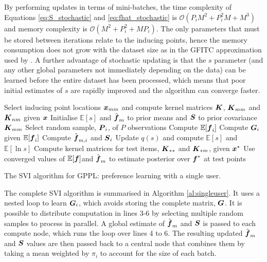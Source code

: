 By performing updates in terms of mini-batches, 
the time complexity of Equations \ref{eq:S_stochastic} and
\ref{eq:fhat_stochastic} is
$\mathcal{O}(P_i M^2 + P_i^2 M + M^3)$ and
memory complexity is  $\mathcal{O}(M^2 + P_i^2 + M P_i)$.
The only parameters that must be stored between iterations relate to the 
inducing points, hence the memory consumption does not grow with the dataset size 
as in the GFITC approximation used by \citet{houlsby2012collaborative}.
A further advantage of stochastic updating is that the $s$ parameter (and any other global
parameters not immediately depending on the data) can be learned
before the entire dataset has been processed,
which means that poor initial estimates of $s$ are rapidly improved
and the algorithm can converge faster.

\begin{algorithm}[t]
 \nl Select inducing point locations $\boldsymbol x_{mm}$ and compute kernel matrices $\boldsymbol K$, $\boldsymbol K_{mm}$ and $\boldsymbol K_{nm}$ given $\boldsymbol x$ \;
 \nl Initialise $\mathbb{E}[s]$ and $\hat{\boldsymbol f}_m$ to prior means
 and $\boldsymbol S$ to prior covariance $\boldsymbol K_{mm}$\;
 {
 \nl Select random sample, $\boldsymbol P_i$, of $P$ observations\;
  {
  \nl Compute $\mathbb{E}[\boldsymbol f_i]$ \;
  \nl Compute $\boldsymbol G_i$ given $\mathbb{E}[\boldsymbol f_i]$ \;
  \nl Compute $\hat{\boldsymbol f}_{m,i}$ and $\boldsymbol S_{i}$ \;
  }
 \nl Update $q(s)$ and compute $\mathbb{E}[s]$ and $\mathbb{E}[\ln s]$\;
 }
\nl Compute kernel matrices for test items, $\boldsymbol K_{**}$ and $\boldsymbol K_{*m}$, given $\boldsymbol x^*$ \;
\nl Use converged values of $\mathbb{E}[\boldsymbol f]$and $\hat{\boldsymbol f}_m$ to estimate
posterior over $\boldsymbol f^*$ at test points \;
\vspace{0.2cm}
\caption{The SVI algorithm for GPPL: preference learning with a single user.}
\label{al:singleuser}
\end{algorithm}
The complete SVI algorithm is summarised in Algorithm \ref{al:singleuser}.
It uses a nested loop to learn $\boldsymbol G_i$, which avoids storing the complete matrix, 
$\boldsymbol G$.
It is possible to distribute computation in lines 3-6 by selecting multiple random samples
to process in parallel. A global estimate of $\hat{\boldsymbol f}_m$ and $\boldsymbol S$
is passed to each compute node, which runs the loop over lines 4 to 6.
The resulting updated $\hat{\boldsymbol f}_m$ and $\boldsymbol S$ values are then passed back to a 
central node that combines them by taking a mean weighted by $\pi_i$ to account for 
the size of each batch. 

